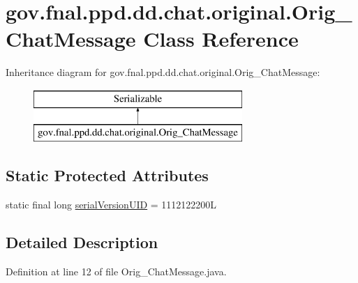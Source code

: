 \hypertarget{classgov_1_1fnal_1_1ppd_1_1dd_1_1chat_1_1original_1_1Orig__ChatMessage}{\section{gov.\-fnal.\-ppd.\-dd.\-chat.\-original.\-Orig\-\_\-\-Chat\-Message Class Reference}
\label{classgov_1_1fnal_1_1ppd_1_1dd_1_1chat_1_1original_1_1Orig__ChatMessage}
}
Inheritance diagram for gov.\-fnal.\-ppd.\-dd.\-chat.\-original.\-Orig\-\_\-\-Chat\-Message\-:\begin{figure}[H]
\begin{center}
\leavevmode
\includegraphics[height=2.000000cm]{classgov_1_1fnal_1_1ppd_1_1dd_1_1chat_1_1original_1_1Orig__ChatMessage}
\end{center}
\end{figure}
\subsection*{Static Protected Attributes}
\begin{DoxyCompactItemize}
\item 
static final long \hyperlink{classgov_1_1fnal_1_1ppd_1_1dd_1_1chat_1_1original_1_1Orig__ChatMessage_a4bcf6ea6cc0667a564c60e207bcc9aba}{serial\-Version\-U\-I\-D} = 1112122200\-L
\end{DoxyCompactItemize}


\subsection{Detailed Description}


Definition at line 12 of file Orig\-\_\-\-Chat\-Message.\-java.



